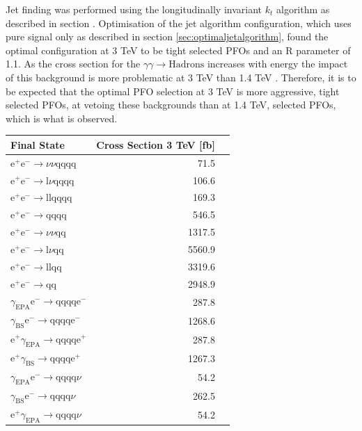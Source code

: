 Jet finding was performed using the longitudinally invariant $k_{t}$ algorithm as described in section \label{sec:jetpairing}.  Optimisation of the jet algorithm configuration, which uses pure signal only as described in section \ref{sec:optimaljetalgorithm}, found the optimal configuration at 3 TeV to be tight selected PFOs and an R parameter of 1.1.  As the cross section for the $\gamma\gamma \rightarrow \text{Hadrons}$ increases with energy the impact of this background is more problematic at 3 TeV than 1.4 TeV \cite{arXiv:1209.4039}.  Therefore, it is to be expected that the optimal PFO selection at 3 TeV is more aggressive, tight selected PFOs, at vetoing these backgrounds than at 1.4 TeV, selected PFOs, which is what is observed.   
\begin{table}[h!]
\centering
\begin{tabular}{ l r r }
\hline
Final State & Cross Section 3 TeV [fb]  \\ 
\hline
$\text{e}^{+}\text{e}^{-} \rightarrow \nu{\nu}\text{qqqq}$ & 71.5 \\
$\text{e}^{+}\text{e}^{-} \rightarrow \text{l}\nu\text{qqqq}$ & 106.6 \\
$\text{e}^{+}\text{e}^{-} \rightarrow \text{llqqqq}$ & 169.3 \\
$\text{e}^{+}\text{e}^{-} \rightarrow \text{qqqq}$ & 546.5 \\
$\text{e}^{+}\text{e}^{-} \rightarrow \nu{\nu}\text{qq}$ & 1317.5 \\
$\text{e}^{+}\text{e}^{-} \rightarrow \text{l}\nu\text{qq}$ & 5560.9 \\
$\text{e}^{+}\text{e}^{-} \rightarrow \text{llqq}$ & 3319.6 \\
$\text{e}^{+}\text{e}^{-} \rightarrow \text{qq}$ & 2948.9 \\
$\gamma_{\text{EPA}}\text{e}^{-} \rightarrow \text{qqqq}\text{e}^{-}$ & 287.8 \\
$\gamma_{\text{BS}}\text{e}^{-} \rightarrow \text{qqqq}\text{e}^{-}$ & 1268.6 \\
$\text{e}^{+}\gamma_{\text{EPA}} \rightarrow \text{qqqq}\text{e}^{+}$ & 287.8 \\
$\text{e}^{+}\gamma_{\text{BS}} \rightarrow \text{qqqq}\text{e}^{+}$ & 1267.3 \\
$\gamma_{\text{EPA}}\text{e}^{-} \rightarrow \text{qqqq}\nu$ & 54.2 \\
$\gamma_{\text{BS}}\text{e}^{-} \rightarrow \text{qqqq}\nu$ & 262.5 \\
$\text{e}^{+}\gamma_{\text{EPA}} \rightarrow \text{qqqq}\nu$ & 54.2 \\

\end{tabular}
\end{table}
